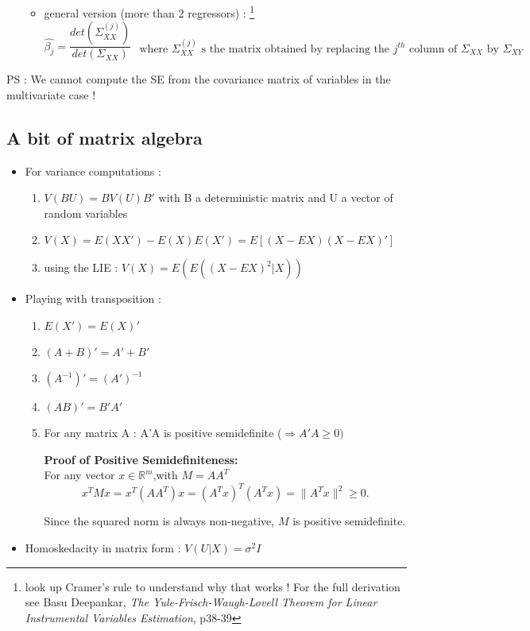 \documentclass{article}
\begin{document}
\begin{nikibox}
\begin{enumerate}
\begin{itemize}
\begin{equation}
            \end{equation}
            \item general version (more than 2 regressors) : \footnote{look up Cramer's rule to understand why that works ! For the full derivation see Basu Deepankar, \textit{The Yule-Frisch-Waugh-Lovell Theorem for Linear Instrumental Variables Estimation}, p38-39}
            \begin{equation}
\hat{\beta_j}=\frac{det(\Sigma_{XX}^{(j)})}{det(\Sigma_{XX})} \substack{\text{ where $\Sigma_{XX}^{(j)}$ s the matrix obtained by replacing the $j^{th}$ column of $\Sigma_{XX}$ by $\Sigma_{XY}$}}
            \end{equation}
        \end{itemize}
    \end{enumerate}
    PS : We cannot compute the SE from the covariance matrix of variables in the multivariate case ! 
\end{nikibox}
    

\subsection{A bit of matrix algebra}
\begin{itemize}
    \item For variance computations : 
    \begin{enumerate}
        \item $V(BU) = BV(U)B'$ with B a deterministic matrix and U a vector of random variables
        \item $V(X) = E(XX') - E(X)E(X') = E[(X-EX)(X-EX)']$
        \item using the LIE : $V(X) = E(E((X-EX)^2|X))$
    \end{enumerate}
    \item Playing with transposition : 
    \begin{enumerate}
        \item $E(X') = E(X)'$
        \item $(A+B)'=A'+B'$
        \item $(A^{-1})'=(A')^{-1}$
        \item $(AB)'=B'A'$
        \item For any matrix A : A'A is positive semidefinite ($\Longrightarrow A'A \geq0)$
        \begin{proofbox}
            \textbf{Proof of Positive Semidefiniteness:}\\
    For any vector $x \in \mathbb{R}^m$,with $M=AA^T$
    $$    x^T M x = x^T (A A^T) x = (A^T x)^T (A^T x) = \|A^T x\|^2 \ge 0.    $$
    
    Since the squared norm is always non-negative, $M$ is positive semidefinite.
        \end{proofbox}
    \end{enumerate}
    \item Homoskedacity in matrix form : $V(U|X) = \sigma^2I$ 
\end{itemize}
\end{document}

